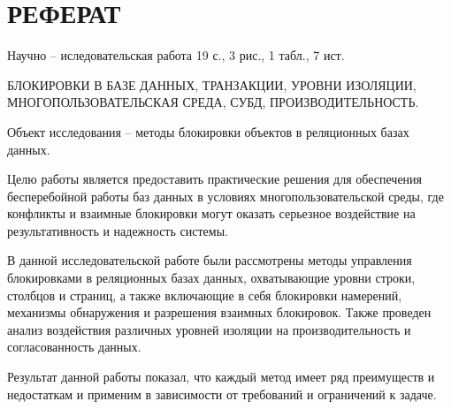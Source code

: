 \chapter*{\hfill{\centering РЕФЕРАТ}\hfill}
\setcounter{page}{2}

Научно -- иследовательская работа 19 с., 3 рис., 1 табл., 7 ист.

БЛОКИРОВКИ В БАЗЕ ДАННЫХ, ТРАНЗАКЦИИ, УРОВНИ ИЗОЛЯЦИИ, МНОГОПОЛЬЗОВАТЕЛЬСКАЯ СРЕДА, СУБД, ПРОИЗВОДИТЕЛЬНОСТЬ.

Объект исследования -- методы блокировки объектов в реляционных базах данных.

Целю работы является предоставить практические решения для обеспечения бесперебойной работы баз данных в условиях многопользовательской среды, где конфликты и взаимные блокировки могут оказать серьезное воздействие на результативность и надежность системы.

В данной исследовательской работе были рассмотрены методы управления блокировками в реляционных базах данных, охватывающие уровни строки, столбцов и страниц, а также включающие в себя блокировки намерений, механизмы обнаружения и разрешения взаимных блокировок. 
Также проведен анализ воздействия различных уровней изоляции на производительность и согласованность данных.

Результат данной работы показал, что каждый метод имеет ряд преимуществ и недостаткам и применим в зависимости от требований и ограничений к задаче.